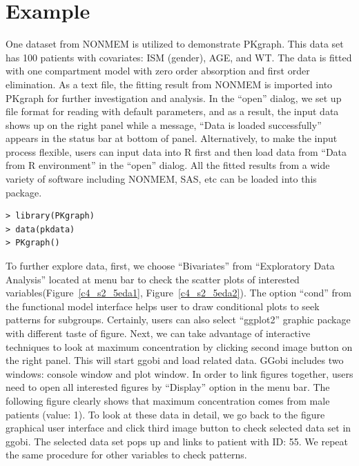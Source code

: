 \documentclass[a4paper]{article}
\begin{document}
\section{Example}
One dataset from NONMEM is utilized to demonstrate PKgraph. This data set has 100 patients with covariates: ISM (gender), AGE, and WT. The data is fitted with one compartment model with zero order absorption and first order elimination.
\newline
\newline
As a text file, the fitting result from NONMEM is imported into PKgraph for further investigation and analysis. In the ``open'' dialog, we set up file format for reading with default parameters, and as a result, the input data shows up on the right panel while a message, ``Data is loaded successfully'' appears in the status bar at bottom of panel.
\newline
\newline
Alternatively, to make the input process flexible, users can input data into R first and then load data from ``Data from R environment'' in the ``open'' dialog. All the fitted results from a wide variety of software including NONMEM, SAS, etc can be loaded into this package.
\begin{verbatim}
> library(PKgraph)
> data(pkdata)
> PKgraph()
\end{verbatim}
To further explore data, first, we choose ``Bivariates'' from ``Exploratory Data Analysis'' located at menu bar to check the scatter plots of interested variables(Figure~\ref{c4_s2_5eda1}, Figure~\ref{c4_s2_5eda2}). The option ``cond'' from the functional model interface helps user to draw conditional plots to seek patterns for subgroups. Certainly, users can also select ``ggplot2'' graphic package with different taste of figure. Next, we can take advantage of interactive techniques to look at maximum concentration by clicking second image button on the right panel. This will start ggobi and load related data. GGobi includes two windows: console window and plot window. In order to link figures together, users need to open all interested figures by ``Display'' option in the menu bar. The following figure clearly shows that maximum concentration comes from male patients (value: 1). To look at these data in detail, we go back to the figure graphical user interface and click third image button to check selected data set in ggobi. The selected data set pops up and links to patient with ID: 55. We repeat the same procedure for other variables to check patterns.
\end{document}
